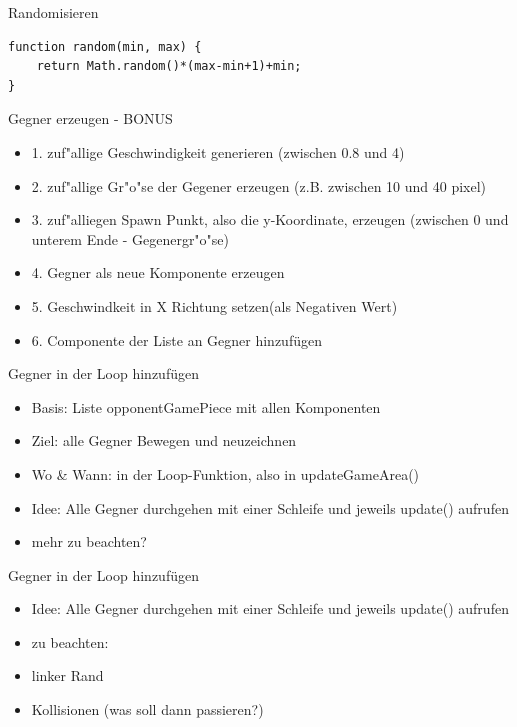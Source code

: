 \documentclass[18pt]{beamer}
\begin{document}
\begin{frame}[fragile]{Randomisieren}
\begin{lstlisting}
function random(min, max) {
	return Math.random()*(max-min+1)+min;
}
\end{lstlisting}
\end{frame}

\begin{frame}[fragile]{Gegner erzeugen - BONUS}
\begin{itemize}
	\item 1. zuf"allige Geschwindigkeit generieren (zwischen 0.8 und 4)
	 \item 2. zuf"allige Gr"o"se der Gegener erzeugen (z.B. zwischen 10 und 40 pixel)  
	\item 3. zuf"alliegen Spawn Punkt, also die y-Koordinate, erzeugen (zwischen 0 und unterem Ende - Gegenergr"o"se) 
	\item 4. Gegner als neue Komponente erzeugen
	\item 5. Geschwindkeit in X Richtung setzen(als Negativen Wert)
	\item 6. Componente der Liste an Gegner hinzufügen	
\end{itemize}
\end{frame}

\begin{frame}{Gegner in der Loop hinzufügen}
\begin{itemize}
	\item Basis: Liste opponentGamePiece mit allen Komponenten
	\item Ziel: alle Gegner Bewegen und neuzeichnen 
	\item Wo \& Wann: in der Loop-Funktion, also in updateGameArea()
	\item Idee: Alle Gegner durchgehen mit einer Schleife und jeweils update() aufrufen
	\item mehr zu beachten? 
\end{itemize}
\end{frame}

\begin{frame}{Gegner in der Loop hinzufügen}
\begin{itemize}
	\item Idee: Alle Gegner durchgehen mit einer Schleife und jeweils update() aufrufen
	\item zu beachten:
	\item linker Rand
	\item Kollisionen (was soll dann passieren?) 
\end{itemize}
\end{frame}
\end{document}
